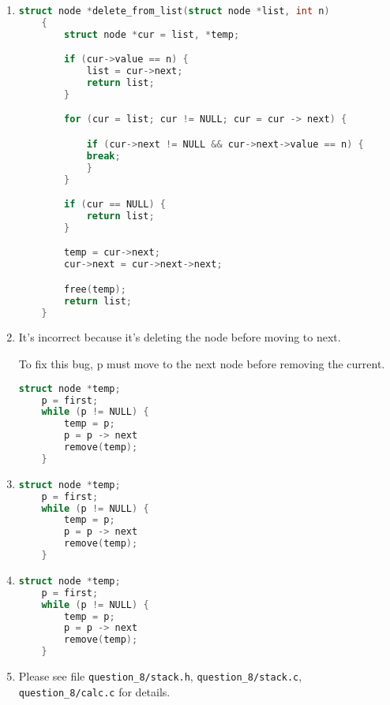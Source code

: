 \documentclass[12pt]{article}
\begin{document}
\begin{enumerate}[1.]
    \item

\begin{lstlisting}[language=c]
    struct node *delete_from_list(struct node *list, int n)
    {
        struct node *cur = list, *temp;

        if (cur->value == n) {
            list = cur->next;
            return list;
        }

        for (cur = list; cur != NULL; cur = cur -> next) {

            if (cur->next != NULL && cur->next->value == n) {
            break;
            }
        }

        if (cur == NULL) {
            return list;
        }

        temp = cur->next;
        cur->next = cur->next->next;

        free(temp);
        return list;
    }
\end{lstlisting}

    \item

    It's incorrect because it's deleting the node before moving to next.

    \bigskip

    To fix this bug, p must move to the next node before removing the current.

\begin{lstlisting}[language=c]
    struct node *temp;
    p = first;
    while (p != NULL) {
        temp = p;
        p = p -> next
        remove(temp);
    }
\end{lstlisting}

    \item

\begin{lstlisting}[language=c]
    struct node *temp;
    p = first;
    while (p != NULL) {
        temp = p;
        p = p -> next
        remove(temp);
    }
\end{lstlisting}

    \item

\begin{lstlisting}[language=c]
    struct node *temp;
    p = first;
    while (p != NULL) {
        temp = p;
        p = p -> next
        remove(temp);
    }
\end{lstlisting}

    \item

    Please see file \texttt{question\_8/stack.h}, \texttt{question\_8/stack.c},
    \texttt{question\_8/calc.c} for details.


\end{enumerate}
\end{document}
